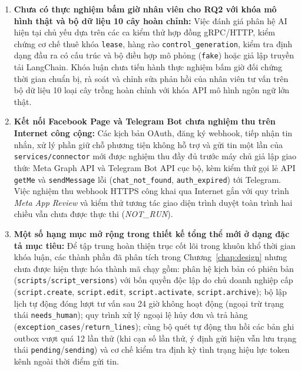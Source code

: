 \begin{enumerate}
  \item \textbf{Chưa có thực nghiệm bấm giờ nhân viên cho RQ2 với khóa mô hình thật và bộ dữ liệu 10 cây hoàn chỉnh:} Việc đánh giá phân hệ AI hiện tại chủ yếu dựa trên các ca kiểm thử hợp đồng gRPC/\hspace{0pt}HTTP, kiểm chứng cơ chế thuê khóa \texttt{lease}, hàng rào \texttt{control\_\hspace{0pt}generation}, kiểm tra định dạng đầu ra có cấu trúc và bộ điều hợp mô phỏng (\texttt{fake}) hoặc giả lập truyền tải LangChain. Khóa luận chưa tiến hành thực nghiệm bấm giờ đối chứng thời gian chuẩn bị, rà soát và chỉnh sửa phản hồi của nhân viên tư vấn trên bộ dữ liệu 10 loại cây trồng hoàn chỉnh với khóa API mô hình ngôn ngữ lớn thật.
  \item \textbf{Kết nối Facebook Page và Telegram Bot chưa nghiệm thu trên Internet công cộng:} Các kịch bản OAuth, đăng ký webhook, tiếp nhận tin nhắn, xử lý phần giữ chỗ phương tiện không hỗ trợ và gửi tin một lần của \texttt{services/\hspace{0pt}connector} mới được nghiệm thu đầy đủ trước máy chủ giả lập giao thức Meta Graph API và Telegram Bot API cục bộ, kèm kiểm thử gọi lẻ API \texttt{getMe} và \texttt{sendMessage} lỗi (\texttt{chat\_\hspace{0pt}not\_\hspace{0pt}found}, \texttt{auth\_\hspace{0pt}expired}) tới Telegram. Việc nghiệm thu webhook HTTPS công khai qua Internet gắn với quy trình \emph{Meta App Review} và kiểm thử tương tác giao diện trình duyệt toàn trình hai chiều vẫn chưa được thực thi (\emph{NOT\_RUN}).
  \item \textbf{Một số hạng mục mở rộng trong thiết kế tổng thể mới ở dạng đặc tả mục tiêu:} Để tập trung hoàn thiện trục cốt lõi trong khuôn khổ thời gian khóa luận, các thành phần đã phân tích trong Chương~\ref{chap:design} nhưng chưa được hiện thực hóa thành mã chạy gồm: phân hệ kịch bản có phiên bản (\texttt{scripts}/\hspace{0pt}\texttt{script\_\hspace{0pt}versions}) với bốn quyền độc lập do chủ doanh nghiệp cấp (\texttt{script.\hspace{0pt}create}, \texttt{script.\hspace{0pt}edit}, \texttt{script.\hspace{0pt}activate}, \texttt{script.\hspace{0pt}archive}); bộ lập lịch tự động đóng lượt tư vấn sau 24 giờ không hoạt động (ngoại trừ trạng thái \texttt{needs\_\hspace{0pt}human}); quy trình xử lý ngoại lệ hủy đơn và trả hàng (\texttt{exception\_\hspace{0pt}cases}/\hspace{0pt}\texttt{return\_\hspace{0pt}lines}); cùng bộ quét tự động thu hồi các bản ghi outbox vượt quá 12 lần thử (khi cạn số lần thử, ý định gửi hiện vẫn lưu trạng thái \texttt{pending}/\hspace{0pt}\texttt{sending}) và cơ chế kiểm tra định kỳ tình trạng hiệu lực token kênh ngoài thời điểm gửi tin.

\end{enumerate}

